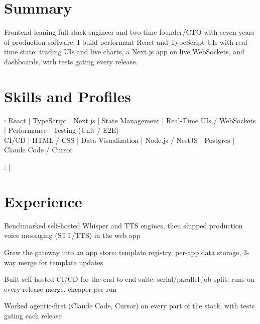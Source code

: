 \documentclass[print]{jack-resume}
\begin{document}
\pagecolor{darkmodeBackground}


\begin{minipage}[t][1cm][t]{.03\textwidth}
    \hfill
\end{minipage}

\section{Summary}
Frontend-leaning full-stack engineer and two-time founder/CTO with seven years of production software. I build performant React and TypeScript UIs with real-time state: trading UIs and live charts, a Next.js app on live WebSockets, and dashboards, with tests gating every release.
\sectionsep

\section{Skills and Profiles}
:
React \hfill | \hfill
TypeScript \hfill | \hfill
Next.js \hfill | \hfill
State Management \hfill | \hfill
Real-Time UIs / WebSockets \hfill | \hfill
Performance \hfill | \hfill
Testing (Unit / E2E) \\
\hspace{1.0cm} CI/CD \hfill | \hfill
HTML / CSS \hfill | \hfill
Data Visualization \hfill | \hfill
Node.js / NestJS \hfill | \hfill
Postgres \hfill | \hfill
Claude Code / Cursor \\

\raggedright{
    :
      \href{https://www.linkedin.com/in/jack-sturtevant/}{ \ExternalLink} |
     \href{https://github.com/jacksturt}{ \ExternalLink}}

\section{Experience}

\begin{tightemize}
    \item Benchmarked self-hosted Whisper and TTS engines, then shipped production voice messaging (STT/TTS) in the web app
    \item Grew the gateway into an app store: template registry, per-app data storage, 3-way merge for template updates
    \item Built self-hosted CI/CD for the end-to-end suite: serial/parallel job split, runs on every release merge, cheaper per run
    \item Worked agentic-first (Claude Code, Cursor) on every part of the stack, with tests gating each release
\end{tightemize}
\sectionsep
\end{document}
